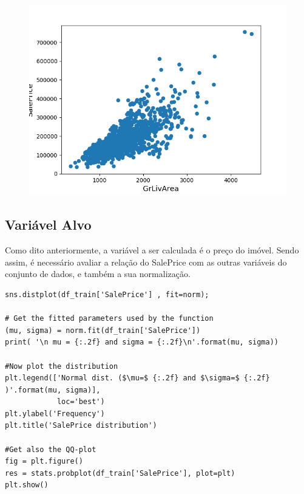 \begin{figure}[H]
	\centering
	\includegraphics[keepaspectratio,width=1\textwidth]{img/outlier-retirados.png}
\end{figure}

\subsection{Variável Alvo}

Como dito anteriormente, a variável a ser calculada é o preço do imóvel. Sendo assim, é necessário avaliar a relação do SalePrice com as outras variáveis do conjunto de dados, e também a sua normalização.


\begin{lstlisting}
sns.distplot(df_train['SalePrice'] , fit=norm);

# Get the fitted parameters used by the function
(mu, sigma) = norm.fit(df_train['SalePrice'])
print( '\n mu = {:.2f} and sigma = {:.2f}\n'.format(mu, sigma))

#Now plot the distribution
plt.legend(['Normal dist. ($\mu=$ {:.2f} and $\sigma=$ {:.2f} )'.format(mu, sigma)],
            loc='best')
plt.ylabel('Frequency')
plt.title('SalePrice distribution')

#Get also the QQ-plot
fig = plt.figure()
res = stats.probplot(df_train['SalePrice'], plot=plt)
plt.show()

\end{lstlisting}

